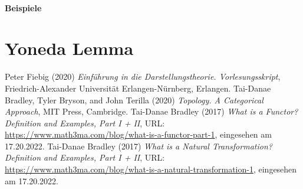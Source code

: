 \documentclass{article}
\theoremstyle{plain}
\theoremstyle{definition}
\theoremstyle{remark}
\begin{document}
\paragraph{Beispiele}

\section{Yoneda Lemma}


\begin{thebibliography}{9}
 Peter Fiebig (2020) \emph{Einführung in die Darstellungstheorie. Vorlesungsskript}, Friedrich-Alexander Universität Erlangen-Nürnberg, Erlangen.
 Tai-Danae Bradley, Tyler Bryson, and John Terilla (2020) \emph{Topology. A Categorical Approach}, MIT Press, Cambridge.
 Tai-Danae Bradley (2017) \emph{What is a Functor? Definition and Examples, Part I + II}, URL: \url{https://www.math3ma.com/blog/what-is-a-functor-part-1}, eingesehen am 17.20.2022.
 Tai-Danae Bradley (2017) \emph{What is a Natural Transformation? Definition and Examples, Part I + II}, URL: \url{https://www.math3ma.com/blog/what-is-a-natural-transformation-1}, eingesehen am 17.20.2022.
\end{thebibliography}
\end{document}

